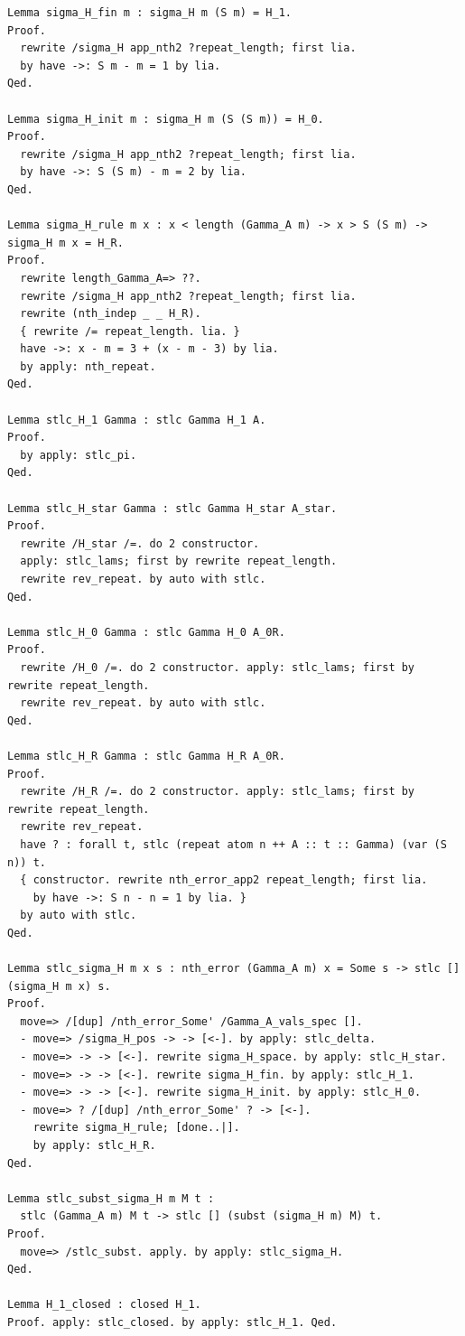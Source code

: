 \documentclass[10pt,a4paper]{amsart}
\begin{document}
\begin{lstlisting}
Lemma sigma_H_fin m : sigma_H m (S m) = H_1.
Proof.
  rewrite /sigma_H app_nth2 ?repeat_length; first lia.
  by have ->: S m - m = 1 by lia.
Qed.

Lemma sigma_H_init m : sigma_H m (S (S m)) = H_0.
Proof.
  rewrite /sigma_H app_nth2 ?repeat_length; first lia.
  by have ->: S (S m) - m = 2 by lia.
Qed.

Lemma sigma_H_rule m x : x < length (Gamma_A m) -> x > S (S m) -> sigma_H m x = H_R.
Proof.
  rewrite length_Gamma_A=> ??.
  rewrite /sigma_H app_nth2 ?repeat_length; first lia.
  rewrite (nth_indep _ _ H_R).
  { rewrite /= repeat_length. lia. }
  have ->: x - m = 3 + (x - m - 3) by lia.
  by apply: nth_repeat.
Qed.

Lemma stlc_H_1 Gamma : stlc Gamma H_1 A.
Proof.
  by apply: stlc_pi.
Qed.

Lemma stlc_H_star Gamma : stlc Gamma H_star A_star.
Proof.
  rewrite /H_star /=. do 2 constructor.
  apply: stlc_lams; first by rewrite repeat_length.
  rewrite rev_repeat. by auto with stlc.
Qed.

Lemma stlc_H_0 Gamma : stlc Gamma H_0 A_0R.
Proof.
  rewrite /H_0 /=. do 2 constructor. apply: stlc_lams; first by rewrite repeat_length.
  rewrite rev_repeat. by auto with stlc.
Qed.

Lemma stlc_H_R Gamma : stlc Gamma H_R A_0R.
Proof.
  rewrite /H_R /=. do 2 constructor. apply: stlc_lams; first by rewrite repeat_length.
  rewrite rev_repeat.
  have ? : forall t, stlc (repeat atom n ++ A :: t :: Gamma) (var (S n)) t.
  { constructor. rewrite nth_error_app2 repeat_length; first lia.
    by have ->: S n - n = 1 by lia. }
  by auto with stlc.
Qed.

Lemma stlc_sigma_H m x s : nth_error (Gamma_A m) x = Some s -> stlc [] (sigma_H m x) s.
Proof.
  move=> /[dup] /nth_error_Some' /Gamma_A_vals_spec [].
  - move=> /sigma_H_pos -> -> [<-]. by apply: stlc_delta.
  - move=> -> -> [<-]. rewrite sigma_H_space. by apply: stlc_H_star.
  - move=> -> -> [<-]. rewrite sigma_H_fin. by apply: stlc_H_1.
  - move=> -> -> [<-]. rewrite sigma_H_init. by apply: stlc_H_0.
  - move=> ? /[dup] /nth_error_Some' ? -> [<-].
    rewrite sigma_H_rule; [done..|].
    by apply: stlc_H_R.
Qed.

Lemma stlc_subst_sigma_H m M t : 
  stlc (Gamma_A m) M t -> stlc [] (subst (sigma_H m) M) t.
Proof.
  move=> /stlc_subst. apply. by apply: stlc_sigma_H.
Qed.

Lemma H_1_closed : closed H_1.
Proof. apply: stlc_closed. by apply: stlc_H_1. Qed.


\end{lstlisting}
\end{document}
